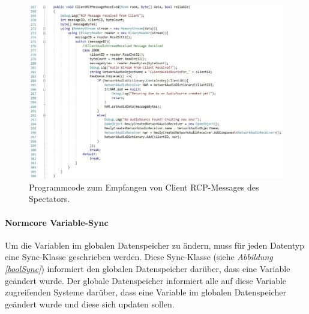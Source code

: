 \documentclass[a4paper,11pt]{article}%
\renewcommand{\\}{\vspace*{0.5\baselineskip} \newline}
\begin{document}
\begin{figure}[H]
		\begin{footnotesize}
		\centering
			\includegraphics[width=\textwidth]{Abbildungen/ClientRCPMessageReceived.jpg}	
			\caption[RCP-Message Handling]{Programmcode zum Empfangen von Client RCP-Messages des Spectators.}
			\label{ClientRCPMessageReceived}
		\end{footnotesize}
	\end{figure}
	
\paragraph{Normcore Variable-Sync}
Um die Variablen im globalen Datenspeicher zu ändern, muss für jeden Datentyp eine Sync-Klasse geschrieben werden. Diese Sync-Klasse (siehe \textit{Abbildung \ref{boolSync}}) informiert den globalen Datenspeicher darüber, dass eine Variable geändert wurde. Der globale Datenspeicher informiert alle auf diese Variable zugreifenden Systeme darüber, dass eine Variable im globalen Datenspeicher geändert wurde und diese sich updaten sollen.
\end{document}
